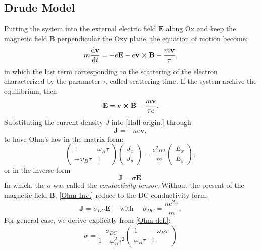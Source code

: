 \documentclass[unnumsec,webpdf,modern,large]{mam-authoring-template}%
\theoremstyle{thmstyleone}%
\theoremstyle{thmstyletwo}%
\theoremstyle{thmstylethree}%
\begin{document}
\begin{appendices}
\subsection{Drude Model}\label{Drude model appendix}
\quad Putting the system into the external electric field \(\textbf{E}\) along Ox and keep the magnetic field \(\textbf{B}\) perpendicular the Oxy plane, the equation of motion become:
\begin{equation}
	m \dv{\textbf{v}}{t} = -e\textbf{E} -e \textbf{v}\cross\textbf{B} - \frac{m \textbf{v}}{\tau},
\end{equation}
\quad in which the last term corresponding to the scattering of the electron characterized by the parameter \(\tau\), called scattering time. If the system archive the equilibrium, then
\begin{equation}\label{Hall origin.}
	\textbf{E} = \textbf{v}\cross\textbf{B} - \frac{m\textbf{v}}{\tau e}.
\end{equation}
\quad Substituting the current density \(J\) into \eqref{Hall origin.} through
\begin{equation}\label{J def.}
	\textbf{J} = -n e \textbf{v},
\end{equation}
to have Ohm's law in the matrix form:
\begin{equation}\label{Ohm def.}
\begin{pmatrix}
	1 & \omega_B \tau\\
	-\omega_B\tau & 1
\end{pmatrix}
\begin{pmatrix}
J_x \\J_y
\end{pmatrix} =\frac{e^2 n \tau}{m} \begin{pmatrix}
E_x \\ E_y
	\end{pmatrix},
\end{equation}
or in the inverse form
\begin{equation}\label{Ohm Inv.}
	\textbf{J} = \sigma \textbf{E}.
\end{equation}
\quad In which, the \(\sigma\) was called the \textit{conductivity tensor}. Without the present of the magnetic field \(\textbf{B}\), \eqref{Ohm Inv.} reduce to the DC conductivity form:
$$\textbf{J} = \sigma_{DC} \textbf{E}\quad  \text{ with } \quad \sigma_{DC} = \frac{ne^2 \tau}{m},$$
\quad For general case, we derive explicitly from \eqref{Ohm def.}:
\begin{equation}
	\sigma = \frac{\sigma_{DC}}{1 + \omega_B^2 \tau^2} \begin{pmatrix}
		1 & -  \omega_B\tau\\
		\omega_B \tau & 1
	\end{pmatrix}
\end{equation}

\end{appendices}
\end{document}
